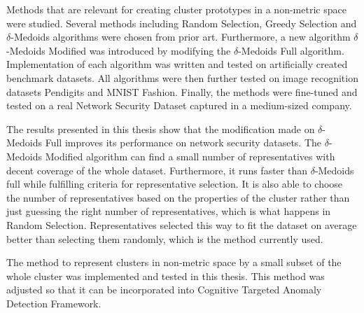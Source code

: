 \documentclass[thesis=B,english]{FITthesis}[2012/10/20]
\begin{document}
Methods that are relevant for creating cluster prototypes in a non-metric space were studied.
Several methods including Random Selection, Greedy Selection and $\delta$-Medoids algorithms were chosen from prior art.
Furthermore, a new algorithm $\delta$-Medoids Modified was introduced by modifying the $\delta$-Medoids Full algorithm.
Implementation of each algorithm was written and tested on artificially created benchmark datasets.
All algorithms were then further tested on image recognition datasets Pendigits and MNIST Fashion.
Finally, the methods were fine-tuned and tested on a real Network Security Dataset captured in a medium-sized company.

The results presented in this thesis show that the modification made on $\delta$-Medoids Full improves its performance on network security datasets.
The $\delta$-Medoids Modified algorithm can find a small number of representatives with decent coverage of the whole dataset.
Furthermore, it runs faster than $\delta$-Medoids full while fulfilling criteria for representative selection.
It is also able to choose the number of representatives based on the properties of the cluster rather than just guessing the right number of representatives, which is what happens in Random Selection.
Representatives selected this way to fit the dataset on average better than selecting them randomly, which is the method currently used.

The method to represent clusters in non-metric space by a small subset of the whole cluster was implemented and tested in this thesis.
This method was adjusted so that it can be incorporated into Cognitive Targeted Anomaly Detection Framework.
\end{document}
